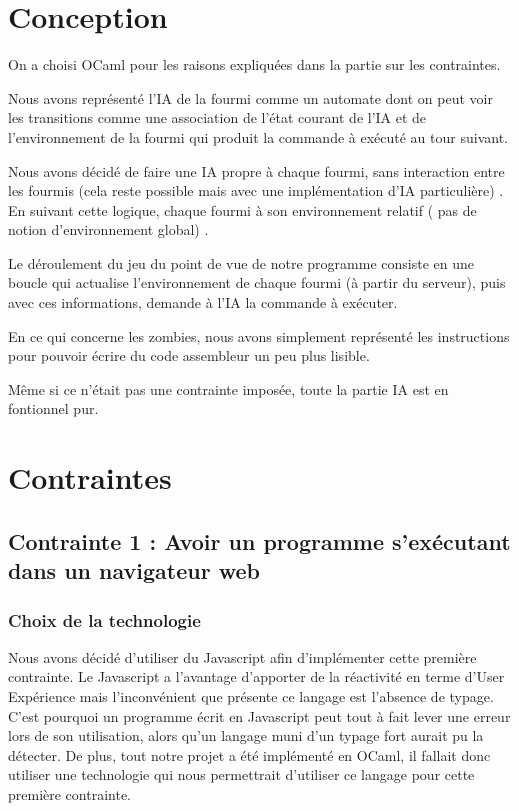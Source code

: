 \documentclass[12pt,a4paper]{report}
\begin{document}
\chapter{Conception}

On a choisi OCaml pour les raisons expliquées dans la partie sur les contraintes.

Nous avons représenté l'IA de la fourmi comme un automate dont on peut voir les transitions comme une association de l'état courant de l'IA  et de l'environnement de la fourmi qui produit la commande à exécuté au tour suivant.
 
Nous avons décidé de faire une IA  propre à chaque fourmi, sans interaction entre les fourmis (cela reste possible mais avec une implémentation d'IA particulière) . 
En suivant cette logique, chaque fourmi à son environnement relatif ( pas de notion 
d'environnement global) .

Le déroulement du jeu du point de vue de notre programme consiste en une boucle qui actualise l'environnement de chaque fourmi (à partir du serveur), puis avec ces informations, demande à l'IA la commande à exécuter.

En ce qui concerne les zombies, nous avons simplement représenté les instructions pour pouvoir écrire du code assembleur un peu plus lisible. 

Même si ce n'était pas une contrainte imposée, toute la partie IA est en fontionnel pur.
\chapter{Contraintes}

\section{Contrainte 1 : Avoir un programme s'exécutant dans un navigateur web}

\subsection{Choix de la technologie}

Nous avons décidé d'utiliser du Javascript afin d'implémenter cette première
contrainte. Le Javascript a l'avantage d'apporter de la réactivité en terme
d'User Expérience mais l'inconvénient que présente ce langage est l'absence
de typage. C'est pourquoi un programme écrit en Javascript peut tout à fait
lever une erreur lors de son utilisation, alors qu'un langage muni d'un
typage fort aurait pu la détecter. De plus, tout notre projet a été
implémenté en OCaml, il fallait donc utiliser une technologie qui nous
permettrait d'utiliser ce langage pour cette première contrainte. \newline
\end{document}
